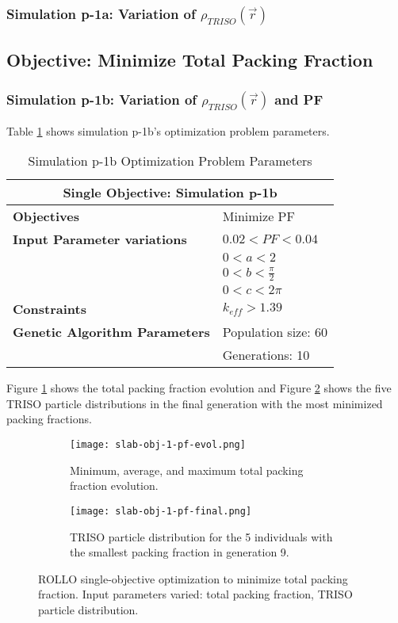 \subsubsection{Simulation p-1a: Variation of $\rho_{TRISO}(\vec{r})$}

\subsection{Objective: Minimize Total Packing Fraction}
\subsubsection{Simulation p-1b: Variation of $\rho_{TRISO}(\vec{r})$ and PF}
Table \ref{tab:simulation1b} shows simulation p-1b's optimization problem parameters. 
\begin{table}[htbp]
    \centering
    \onehalfspacing
    \caption{Simulation p-1b Optimization Problem Parameters}
	\label{tab:simulation1b}
    \footnotesize
    \begin{tabular}{l|p{3cm}}
    \hline 
    \multicolumn{2}{c}{\textbf{Single Objective: Simulation p-1b}} \\
    \hline 
    \textbf{Objectives} & Minimize PF \\
    \hline 
    \textbf{Input Parameter variations} & $0.02<PF<0.04$ \\
    & $0<a<2$ \\
    & $0<b<\frac{\pi}{2}$ \\
    & $0<c<2\pi$ \\
    \hline
    \textbf{Constraints} & $k_{eff} > 1.39$\\ 
    \hline 
    \textbf{Genetic Algorithm Parameters} & Population size: 60 \\
    & Generations: 10 \\
    \hline
    \end{tabular}
\end{table}
Figure \ref{fig:slab-obj-1-pf-evol} shows the total packing fraction evolution and 
Figure \ref{fig:slab-obj-1-pf-final} shows the five TRISO particle distributions in 
the final generation with the most minimized packing fractions. 
\begin{figure}[htbp]
    \centering
    \begin{subfigure}{\textwidth}
        \texttt{[image: slab-obj-1-pf-evol.png]}
        \caption{Minimum, average, and maximum total packing fraction evolution.}
        \label{fig:slab-obj-1-pf-evol} 
    \end{subfigure}
    \begin{subfigure}{\textwidth}
        \texttt{[image: slab-obj-1-pf-final.png]}
        \caption{TRISO particle distribution for the 5 individuals with the 
        smallest packing fraction in generation 9.}
        \label{fig:slab-obj-1-pf-final} 
    \end{subfigure}
    \caption{ROLLO single-objective optimization to minimize total packing fraction. 
    Input parameters varied: total packing fraction, TRISO particle distribution.}
    \label{fig:slab-obj-1-pf}
\end{figure}
